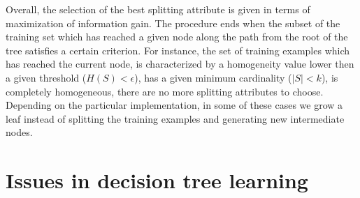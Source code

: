
Overall, the selection of the best splitting attribute is given in terms of maximization of information gain. The procedure ends when the subset of the training set which has reached a given node along the path from the root of the tree satisfies a certain criterion. For instance, the set of training examples which has reached the current node, is characterized by a homogeneity value lower then a given threshold ($H(S)<\epsilon$), has a given minimum cardinality ($|S|<k$), is completely homogeneous, there are no more splitting attributes to choose. Depending on the particular implementation, in some of these cases we grow a leaf instead of splitting the training examples and generating new intermediate nodes.

\section{Issues in decision tree learning}

